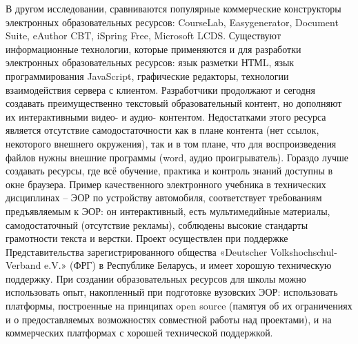 В другом исследовании, сравниваются популярные коммерческие конструкторы электронных образовательных ресурсов: CourseLab, Easygenerator, Document Suite, eAuthor CBT, iSpring Free, Microsoft LCDS.
Существуют информационные технологии, которые применяются и для разработки электронных образовательных ресурсов: язык разметки НТМL, язык программирования JavaScript, графические редакторы, технологии взаимодействия сервера с клиентом\cite[С. 154.]{dementeva17}.
Разработчики продолжают и сегодня создавать преимущественно текстовый образовательный контент, но дополняют их интерактивными видео- и аудио- контентом\cite{opk}. Недостатками этого ресурса является отсутствие самодостаточности как в плане контента (нет ссылок, некоторого внешнего окружения), так и в том плане, что для воспроизведения файлов нужны внешние программы (word, аудио проигрыватель). Гораздо лучше создавать ресурсы, где всё обучение, практика и контроль знаний доступны в окне браузера.
Пример качественного электронного учебника в технических дисциплинах – ЭОР по устройству автомобиля\cite{automobile}, соответствует требованиям предъявляемым к ЭОР: он интерактивный, есть мультимедийные материалы, самодостаточный (отсутствие рекламы), соблюдены высокие стандарты грамотности текста и верстки. Проект осуществлен при поддержке Представительства зарегистрированного общества «Deutscher Volkshochschul-Verband e.V.» (ФРГ) в Республике Беларусь, и имеет хорошую техническую поддержку.
При создании образовательных ресурсов для школы можно использовать опыт, накопленный при подготовке вузовских ЭОР: использовать платформы, построенные на принципах open source (памятуя об их ограничениях и о предоставляемых возможностях совместной работы над проектами), и  на коммерческих платформах с хорошей технической поддержкой.

